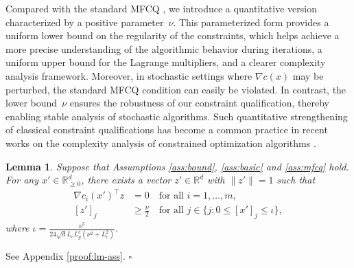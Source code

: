 \documentclass[11pt]{article}
\newenvironment{proof}{{\noindent\it Proof.}\quad}{\hfill $\square$\par}
\def\red#1{\textcolor{red}{#1}}
\newcommand{\R}{\mathbb{R}}
\newtheorem{lemma}{Lemma}
\begin{document}
Compared with the standard MFCQ \cite{mangasarian1967fritz}, we introduce a quantitative version characterized by a positive parameter~$\nu$. 
This parameterized form provides a uniform lower bound on the regularity of the constraints, which helps achieve a more precise understanding of the algorithmic behavior during iterations, a uniform upper bound for the Lagrange multipliers, and a clearer complexity analysis framework. 
Moreover, in stochastic settings where $\nabla c(x)$ may be perturbed, the standard MFCQ condition can easily be violated. 
In contrast, the lower bound~$\nu$ ensures the robustness of our constraint qualification, thereby enabling stable analysis of stochastic algorithms. 
Such quantitative strengthening of classical constraint qualifications has become a common practice in recent works on the complexity analysis of constrained optimization algorithms \cite{curtis2024worst,jia2025first,jin2022stochastic,li2021rate,sahin2019inexact,shi2025momentum}.


\begin{lemma}\label{lm:ass}
    Suppose that Assumptions \ref{ass:bound}, \ref{ass:basic} and \ref{ass:mfcq} hold. For any $x'\in\R^d_{\ge0}$,  there exists a vector \(z' \in \R^d\) with \(\|z'\|=1\) such that 
    \begin{equation}\label{z'}
    \begin{aligned}
    \nabla c_i(x')^\top z & = 0 \quad \text{for all } i = 1, \ldots, m,\\
    [z']_j & \ge \frac{\nu}{2} \quad \text{for all } j \in \{ j : 0 \leq [x']_j \leq \iota \},
    \end{aligned}
    \end{equation}
where $
    \iota=\frac{\nu^5}{{24 \sqrt{d}}L_c L_g^c(\nu^2+L_c^2)}.$
\end{lemma}
\begin{proof}
    See  Appendix \ref{proof:lm-ass}.
\end{proof}

\end{document}
